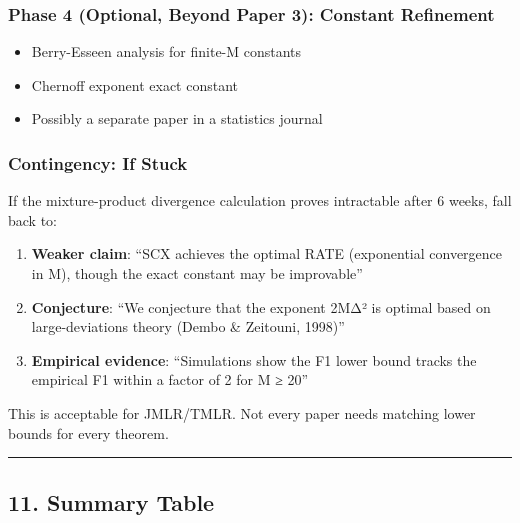 \documentclass[
  12pt,
]{article}
\providecommand{\tightlist}{%
  \setlength{\itemsep}{0pt}\setlength{\parskip}{0pt}}
\begin{document}
\subsubsection{Phase 4 (Optional, Beyond Paper 3): Constant
Refinement}\label{phase-4-optional-beyond-paper-3-constant-refinement}

\begin{itemize}
\tightlist
\item
  Berry-Esseen analysis for finite-M constants
\item
  Chernoff exponent exact constant
\item
  Possibly a separate paper in a statistics journal
\end{itemize}

\subsubsection{Contingency: If Stuck}\label{contingency-if-stuck}

If the mixture-product divergence calculation proves intractable after 6
weeks, fall back to:

\begin{enumerate}
\def\labelenumi{\arabic{enumi}.}
\tightlist
\item
  \textbf{Weaker claim}: ``SCX achieves the optimal RATE (exponential
  convergence in M), though the exact constant may be improvable''
\item
  \textbf{Conjecture}: ``We conjecture that the exponent 2MΔ² is optimal
  based on large-deviations theory (Dembo \& Zeitouni, 1998)''
\item
  \textbf{Empirical evidence}: ``Simulations show the F1 lower bound
  tracks the empirical F1 within a factor of 2 for M ≥ 20''
\end{enumerate}

This is acceptable for JMLR/TMLR. Not every paper needs matching lower
bounds for every theorem.

\begin{center}\rule{0.5\linewidth}{0.5pt}\end{center}

\subsection{11. Summary Table}\label{summary-table}
\end{document}
